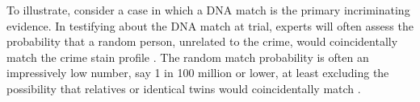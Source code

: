 \documentclass{article}
\newcommand{\pr}{\mathsf{Pr}}
\begin{document}
To illustrate, consider a case in which a DNA match is the primary incriminating evidence. In testifying about the DNA match at trial, experts will often assess the probability that a random person, unrelated to the crime, would coincidentally match the crime stain profile  %
\citep{foreman2003interpreting}.
The random match probability is often an impressively low number, say 1 in 100 million or lower, at least excluding the possibility that relatives or identical twins would coincidentally match \citep{donnelly1995NonindependenceMatchesDifferent}.
%
%
\end{document}

